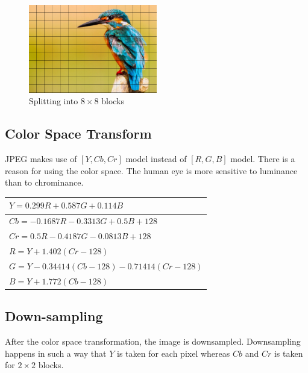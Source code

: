 \vspace{1em}

\begin{figure}[!ht]
    \centering
    \includegraphics[width=0.50\textwidth]{fig/3-3.png}
    \caption{Splitting into $8 \times 8$ blocks}
    \label{fig:splitting}
\end{figure}

\subsection{Color Space Transform}

JPEG makes use of $[Y, Cb, Cr]$ model instead of $[R, G, B]$ model. There is a reason for using the color space. The human eye is more sensitive to luminance than to chrominance. 

\begingroup
\centering
    \begin{tabular}{|l|}
    \hline
    $Y = 0.299R + 0.587G + 0.114B$              \\ \hline
    $Cb = -0.1687R - 0.3313G + 0.5B + 128$      \\ \hline
    $Cr = 0.5R - 0.4187G - 0.0813B + 128$       \\ \hline
    $R = Y + 1.402 (Cr - 128)$                   \\ \hline
    $G = Y - 0.34414 (Cb - 128) - 0.71414(Cr - 128)$ \\ \hline
    $B = Y + 1.772  (Cb - 128)$                   \\ \hline
    \end{tabular}
\label{tbl:RGBYCbCrTable}
\endgroup


\subsection{Down-sampling}

After the color space transformation, the image is downsampled.
Downsampling happens in such a way that $Y$ is taken for each pixel whereas $Cb$ and $Cr$ is taken for $2 \times 2$ blocks.

